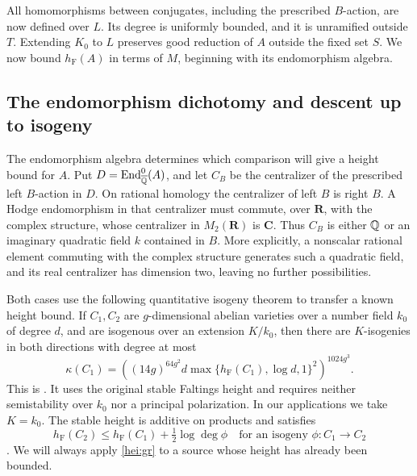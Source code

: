 All homomorphisms between conjugates, including the prescribed
$B$-action, are now defined over $L$.  Its degree is uniformly bounded,
and it is unramified outside $T$.  Extending $K_0$ to $L$ preserves
good reduction of $A$ outside the fixed set $S$.  We now bound
$h_{\mathrm F}(A)$ in terms of $M$, beginning with its endomorphism
algebra.

\subsection{The endomorphism dichotomy and descent up to isogeny}
\label{hei:endomorphisms}

The endomorphism algebra determines which comparison will give a
height bound for $A$.  Put
$D=\operatorname{End}^0_{\overline{\mathbb Q}}(A)$, and let $C_B$ be the
centralizer of the prescribed left $B$-action in $D$.  On rational
homology the centralizer of left $B$ is right $B$.  A Hodge
endomorphism in that centralizer must commute, over $\mathbf R$, with
the complex structure, whose centralizer in $M_2(\mathbf R)$ is
$\mathbf C$.  Thus $C_B$ is either $\mathbb Q$ or an imaginary quadratic
field $k$ contained in $B$.  More explicitly, a nonscalar rational
element commuting with the complex structure generates such a
quadratic field, and its real centralizer has dimension two, leaving
no further possibilities.

Both cases use the following quantitative isogeny theorem to transfer
a known height bound.  If $C_1,C_2$ are $g$-dimensional abelian
varieties over a number field $k_0$ of degree $d$, and are isogenous
over an extension $K/k_0$, then there are $K$-isogenies in both
directions with degree at most
\begin{equation}\label{hei:gr}
 \kappa(C_1)=
 \left((14g)^{64g^2}d
       \max\{h_{\mathrm F}(C_1),\log d,1\}^{2}\right)^{1024g^3}.
\end{equation}
This is \cite[Theorem 1.4, with the definition on p.~2058]{GaudronRemond2014}.
It uses the original stable Faltings height and requires neither
semistability over $k_0$ nor a principal polarization.  In our
applications we take $K=k_0$.  The stable height is additive on
products and satisfies
\begin{equation}\label{hei:isogeny-height}
 h_{\mathrm F}(C_2)\le h_{\mathrm F}(C_1)
                         +\tfrac12\log\deg\phi
 \quad\text{for an isogeny }\phi:C_1\longrightarrow C_2
\end{equation}
\cite{Faltings1983}.  We will always apply \eqref{hei:gr} to a source
whose height has already been bounded.

